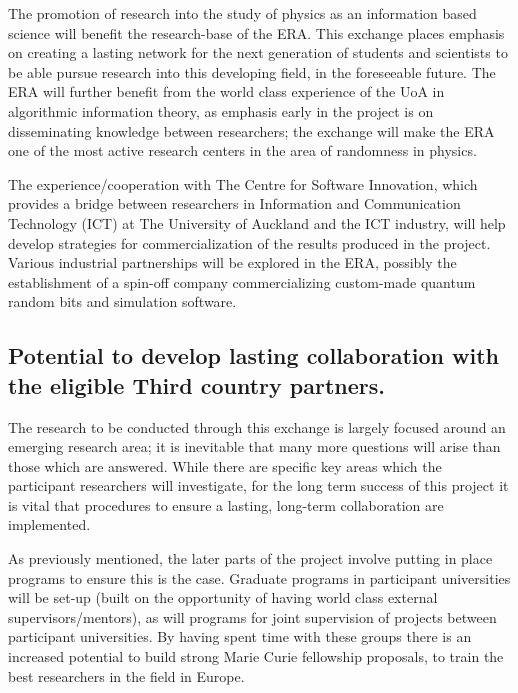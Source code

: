 \documentclass[12pt]{article}
\begin{document}
The promotion of research into the study of physics as an information based science will benefit the research-base of the ERA. This exchange places emphasis on creating a lasting network for the next generation of students and scientists to be able pursue research into this developing field, in the foreseeable future. The ERA will further benefit from the world class experience of the UoA in algorithmic information theory, as emphasis early in the project is on disseminating knowledge between researchers; the exchange will make the ERA one of the most active research centers in the area of randomness in physics.

The experience/cooperation with
The Centre for Software Innovation, which provides a bridge between researchers in Information and Communication Technology (ICT) at The University of Auckland and the ICT industry,  will help develop
strategies for  commercialization of the results produced in the project.
Various industrial partnerships will be explored  in the ERA, possibly
 the establishment of a spin-off company
commercializing custom-made quantum random bits and simulation software.

\subsection{Potential to develop lasting collaboration with the eligible Third country partners.}

The research to be conducted through this exchange is largely focused around an emerging research area; it is inevitable that many more questions will arise than those which are answered. While there are specific key areas which the participant researchers will investigate, for the long term success of this project it is vital that procedures to ensure a lasting, long-term collaboration are implemented.

As previously mentioned, the later parts of the project involve putting in place programs to ensure this is the case. Graduate programs in participant universities will be set-up (built on the opportunity of having world class external supervisors/mentors), as will programs for joint supervision of projects between participant universities. By having spent time with these groups there is an increased potential to build strong Marie Curie fellowship proposals, to train the best researchers in the field in Europe.
\end{document}
